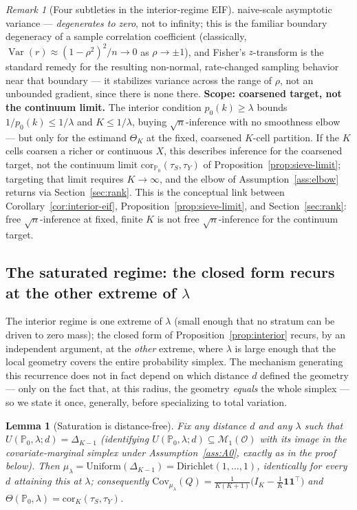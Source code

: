 \documentclass[11pt]{article}
\theoremstyle{plain}
\newtheorem{lemma}[theorem]{Lemma}
\theoremstyle{definition}
\theoremstyle{remark}
\newtheorem{remark}[theorem]{Remark}
\newcommand{\PP}{\mathbb{P}}
\newcommand{\cO}{\mathcal{O}}
\newcommand{\cM}{\mathcal{M}}
\newcommand{\Cov}{\mathrm{Cov}}
\newcommand{\Corr}{\mathrm{cor}}
\DeclareMathOperator{\Var}{Var}
\begin{document}
\begin{remark}[Four subtleties in the interior-regime EIF]
naive-scale asymptotic variance --- \emph{degenerates to zero}, not to infinity;
this is the familiar boundary degeneracy of a sample correlation coefficient
(classically, $\Var(r)\approx(1-\rho^2)^2/n\to0$ as $\rho\to\pm1$), and Fisher's
$z$-transform is the standard remedy for the resulting non-normal, rate-changed
sampling behavior near that boundary --- it stabilizes variance across the range of
$\rho$, not an unbounded gradient, since there is none there. \textbf{Scope: coarsened
target, not the continuum limit.} The interior condition $p_0(k)\ge\lambda$ bounds
$1/p_0(k)\le1/\lambda$ and $K\le1/\lambda$, buying $\sqrt n$-inference with no
smoothness elbow --- but only for the estimand $\Theta_K$ at the fixed, coarsened
$K$-cell partition. If the $K$ cells coarsen a richer or continuous $X$, this
describes inference for the coarsened target, not the continuum limit
$\Corr_{\PP_0}(\tau_S,\tau_Y)$ of Proposition~\ref{prop:sieve-limit}; targeting that
limit requires $K\to\infty$, and the elbow of Assumption~\ref{ass:elbow} returns via
Section~\ref{sec:rank}. This is the conceptual link between
Corollary~\ref{cor:interior-eif}, Proposition~\ref{prop:sieve-limit}, and
Section~\ref{sec:rank}: free $\sqrt n$-inference at fixed, finite $K$ is not free
$\sqrt n$-inference for the continuum target.
\end{remark}

\subsection{The saturated regime: the closed form recurs at the other extreme of
$\lambda$}\label{sec:saturated}

The interior regime is one extreme of $\lambda$ (small enough that no stratum can be
driven to zero mass); the closed form of Proposition~\ref{prop:interior} recurs,
by an independent argument, at the \emph{other} extreme, where $\lambda$ is large
enough that the local geometry covers the entire probability simplex. The
mechanism generating this recurrence does not in fact depend on which distance $d$
defined the geometry --- only on the fact that, at this radius, the geometry
\emph{equals} the whole simplex --- so we state it once, generally, before
specializing to total variation.

\begin{lemma}[Saturation is distance-free]\label{lem:saturation-general}
Fix any distance $d$ and any $\lambda$ such that $U(\PP_0,\lambda;d)=\Delta_{K-1}$
(identifying $U(\PP_0,\lambda;d)\subseteq\cM_1(\cO)$ with its image in the
covariate-marginal simplex under Assumption~\ref{ass:A0}, exactly as in the proof
below). Then $\mu_\lambda=\mathrm{Uniform}(\Delta_{K-1})=\mathrm{Dirichlet}(1,\dots,1)$,
identically for every $d$ attaining this at $\lambda$; consequently
$\Cov_{\mu_\lambda}(Q)=\frac1{K(K+1)}\big(I_K-\frac1K\mathbf1\mathbf1^\top\big)$ and
$\Theta(\PP_0,\lambda)=\Corr_K(\tau_S,\tau_Y)$.
\end{lemma}
\end{document}
